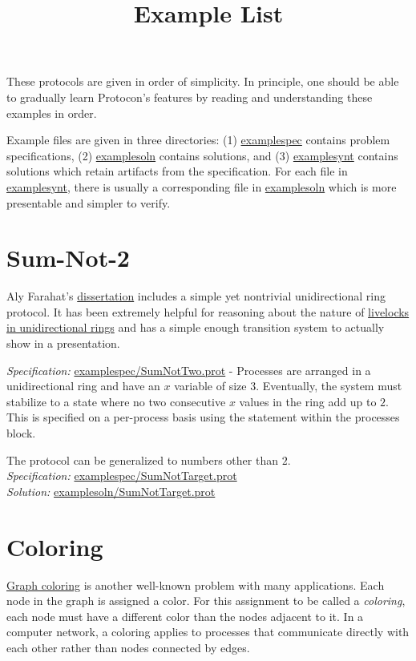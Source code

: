 
\title{Example List}
\date{}



These protocols are given in order of simplicity.
In principle, one should be able to gradually learn Protocon's features by reading and understanding these examples in order.

Example files are given in three directories: (1) \url{examplespec} contains problem specifications, (2) \url{examplesoln} contains solutions, and (3) \url{examplesynt} contains solutions which retain artifacts from the specification.
For each file in \url{examplesynt}, there is usually a corresponding file in \url{examplesoln} which is more presentable and simpler to verify.

\section{Sum-Not-2}

Aly Farahat's \href{http://digitalcommons.mtu.edu/etds/178}{dissertation} includes a simple yet nontrivial unidirectional ring protocol.
It has been extremely helpful for reasoning about the nature of \href{http://dx.doi.org/10.1007/978-3-319-03089-0\_12}{livelocks in unidirectional rings} and has a simple enough transition system to actually show in a presentation.

\textit{Specification:} \url{examplespec/SumNotTwo.prot}
- Processes are arranged in a unidirectional ring and have an $x$ variable of size $3$.
Eventually, the system must stabilize to a state where no two consecutive $x$ values in the ring add up to $2$.
This is specified on a per-process basis using the  statement within the processes block.

The protocol can be generalized to numbers other than $2$.
\\\textit{Specification:} \url{examplespec/SumNotTarget.prot}
\\\textit{Solution:} \url{examplesoln/SumNotTarget.prot}

\section{Coloring}

\href{http://en.wikipedia.org/wiki/Graph\_coloring}{Graph coloring} is another well-known problem with many applications.
Each node in the graph is assigned a color.
For this assignment to be called a \textit{coloring}, each node must have a different color than the nodes adjacent to it.
In a computer network, a coloring applies to processes that communicate directly with each other rather than nodes connected by edges.

